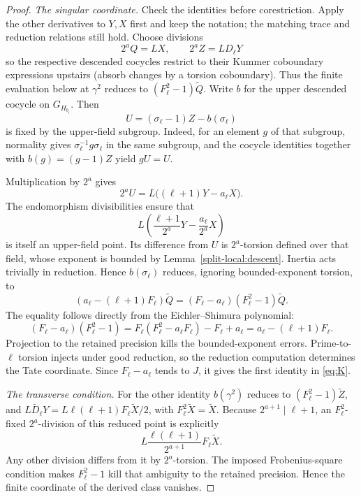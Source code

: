 \begin{proof}
\smallskip\noindent\emph{The singular coordinate.}
Check the identities before corestriction. Apply the other derivatives to \(Y,X\) first and keep the notation; the matching trace and reduction relations still hold. Choose divisions
\[
                  2^a Q=L X,\qquad 2^a Z=L D_\ell Y
\]
so the respective descended cocycles restrict to their Kummer coboundary expressions upstairs (absorb changes by a torsion coboundary). Thus the finite evaluation below at \(\gamma^2\) reduces to \((F_\ell^2-1)\widetilde Q\). Write \(b\) for the upper descended cocycle on \(G_{H_{b_i}}\). Then
\[
                  U=(\sigma_\ell-1)Z-b(\sigma_\ell)
\]
is fixed by the upper-field subgroup. Indeed, for an element \(g\) of that subgroup, normality gives \(\sigma_\ell^{-1}g\sigma_\ell\) in the same subgroup, and the cocycle identities together with \(b(g)=(g-1)Z\) yield \(gU=U\).

Multiplication by \(2^a\) gives
\[
 2^a U=L\big((\ell+1)Y-a_\ell X\big).
\]
The endomorphism divisibilities ensure that
\[
 L\left(\frac{\ell+1}{2^a}Y-\frac{a_\ell}{2^a}X\right)
\]
is itself an upper-field point. Its difference from \(U\) is \(2^a\)-torsion defined over that field, whose exponent is bounded by Lemma~\ref{split-local:descent}. Inertia acts trivially in reduction. Hence \(b(\sigma_\ell)\) reduces, ignoring bounded-exponent torsion, to
\[
      (a_\ell-(\ell+1)F_\ell)\widetilde Q
                         =(F_\ell-a_\ell)(F_\ell^2-1)\widetilde Q.
\]
The equality follows directly from the Eichler--Shimura polynomial:
\[
 (F_\ell-a_\ell)(F_\ell^2-1)
 =F_\ell(F_\ell^2-a_\ell F_\ell)-F_\ell+a_\ell
 =a_\ell-(\ell+1)F_\ell.
\]
Projection to the retained precision kills the bounded-exponent errors. Prime-to-\(\ell\) torsion injects under good reduction, so the reduction computation determines the Tate coordinate. Since \(F_\ell-a_\ell\) tends to \(J\), it gives the first identity in \eqref{eq:K}.

\smallskip\noindent\emph{The transverse condition.}
For the other identity \(b(\gamma^2)\) reduces to \((F_\ell^2-1)\widetilde Z\), and
\(\widetilde{L D_\ell Y}=L\ell(\ell+1)F_\ell\widetilde X/2\), with \(F_\ell^2\widetilde X=\widetilde X\). Because \(2^{a+1}\mid\ell+1\), an \(F_\ell^2\)-fixed \(2^a\)-division of this reduced point is explicitly
\[
 L\frac{\ell(\ell+1)}{2^{a+1}}F_\ell\widetilde X.
\]
Any other division differs from it by \(2^a\)-torsion. The imposed Frobenius-square condition makes \(F_\ell^2-1\) kill that ambiguity to the retained precision. Hence the finite coordinate of the derived class vanishes.


\end{proof}
